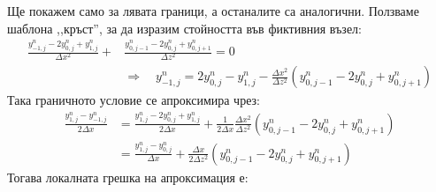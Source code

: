 \documentclass[12pt]{article}
\numberwithin{equation}{section}
\begin{document}
Ще покажем само за лявата граници, а останалите са аналогични. Ползваме шаблона ,,кръст'', за да изразим стойността във фиктивния възел:
\begin{equation}
    \begin{aligned}
        \frac{y^n_{-1,j} - 2y^n_{0,j} + y^n_{1,j}}{\Delta x^2} + &\frac{y^n_{0,j-1} - 2y^n_{0,j} + y^n_{0,j+1}}{\Delta z^2} = 0\\
        &\Rightarrow\quad
        y^n_{-1,j} = 2y^n_{0,j} - y^n_{1,j} - \frac{\Delta x^2}{\Delta z^2}(y^n_{0,j-1} - 2y^n_{0,j} + y^n_{0,j+1})
    \end{aligned}
\end{equation}
Така граничното условие се апроксимира чрез:
\begin{equation}
    \begin{aligned}
        \frac{y^n_{1,j} - y^n_{-1,j}}{2 \Delta x}
        &= \frac{y^n_{1,j} - 2y^n_{0,j} + y^n_{1,j}}{2 \Delta x} + \frac{1}{2\Delta x}\frac{\Delta x^2}{\Delta z^2}(y^n_{0,j-1} - 2y^n_{0,j} + y^n_{0,j+1}) \\
        &= \frac{y^n_{1,j} - y^n_{0,j}}{\Delta x} + \frac{\Delta x}{2\Delta z^2}(y^n_{0,j-1} - 2y^n_{0,j} + y^n_{0,j+1})
    \end{aligned}
\end{equation}
Тогава локалната грешка на апроксимация е:
\end{document}
